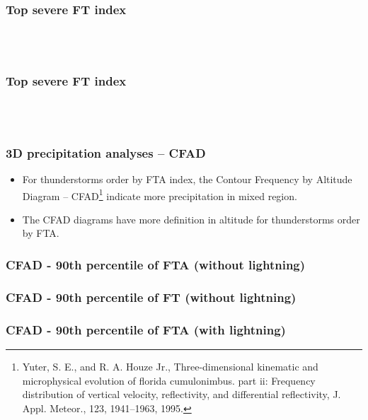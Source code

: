 \documentclass[smaller]{beamer}
\begin{document}
\begin{frame}
\frametitle{Top severe FT index}

~~
\\
\\

\end{frame}

\begin{frame}
\frametitle{Top severe FT index}
~~
\\
\\

\end{frame}




\begin{frame}
\frametitle{3D precipitation analyses -- CFAD}
\begin{itemize}

\item For thunderstorms order by FTA index, the Contour Frequency by Altitude Diagram -- CFAD\footnote{Yuter, S. E., and R. A. Houze Jr., Three-dimensional kinematic and microphysical evolution of florida cumulonimbus.
part ii: Frequency distribution of vertical velocity, reflectivity, and differential reflectivity, J. Appl. Meteor., 123,
1941–1963, 1995.} indicate more precipitation in mixed region.
\item The CFAD diagrams have more definition in altitude for thunderstorms order by FTA.
\end{itemize}
\end{frame}
  
\begin{frame}
\frametitle{CFAD - 90th percentile of FTA (without lightning)}

\end{frame}

\begin{frame}
\frametitle{CFAD - 90th percentile of FT (without lightning)}

\end{frame}

\begin{frame}
\frametitle{CFAD - 90th percentile of FTA (with lightning) }

\end{frame}
\end{document}
